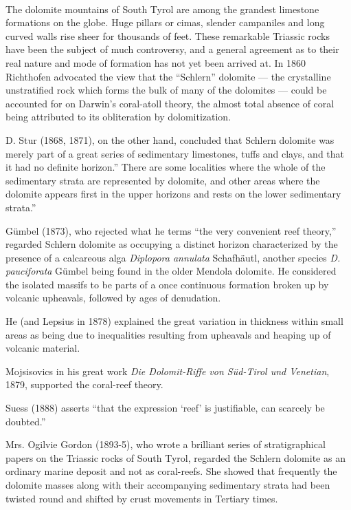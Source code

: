 \documentclass[a4paper, 12pt, oneside]{article}
\begin{document}
\paragraph{}
The dolomite mountains of South Tyrol are among the grandest limestone formations on the globe. Huge pillars or cimas, slender campaniles and long curved walls rise sheer for thousands of feet. These remarkable Triassic rocks have been the subject of much controversy, and a general agreement as to their real nature and mode of formation has not yet been arrived at. In 1860 Richthofen advocated the view that the ``Schlern'' dolomite --- the crystalline unstratified rock which forms the bulk of many of the dolomites --- could be accounted for on Darwin's coral-atoll theory, the almost total absence of coral being attributed to its obliteration by dolomitization.

D. Stur (1868, 1871), on the other hand, concluded that Schlern dolomite was merely part of a great series of sedimentary limestones, tuffs and clays, and that it had no definite horizon.'' There are some localities where the whole of the sedimentary strata are represented by dolomite, and other areas where the dolomite appears first in the upper horizons and rests on the lower sedimentary strata.''

Gümbel (1873), who rejected what he terms ``the very convenient reef theory,'' regarded Schlern dolomite as occupying a distinct horizon characterized by the presence of a calcareous alga \emph{Diplopora annulata} Schafhäutl, another species \emph{D. pauciforata} Gümbel being found in the older Mendola dolomite. He considered the isolated massifs to be parts of a once continuous formation broken up by volcanic upheavals, followed by ages of denudation.

He (and Lepsius in 1878) explained the great variation in thickness within small areas as being due to inequalities resulting from upheavals and heaping up of volcanic material.

Mojsisovics in his great work \emph{Die Dolomit-Riffe von Süd-Tirol und Venetian}, 1879, supported the coral-reef theory.

Suess (1888) asserts ``that the expression `reef' is justifiable, can scarcely be doubted.''

Mrs. Ogilvie Gordon (1893-5), who wrote a brilliant series of stratigraphical papers on the Triassic rocks of South Tyrol, regarded the Schlern dolomite as an ordinary marine deposit and not as coral-reefs. She showed that frequently the dolomite masses along with their accompanying sedimentary strata had been twisted round and shifted by crust movements in Tertiary times.
\end{document}
